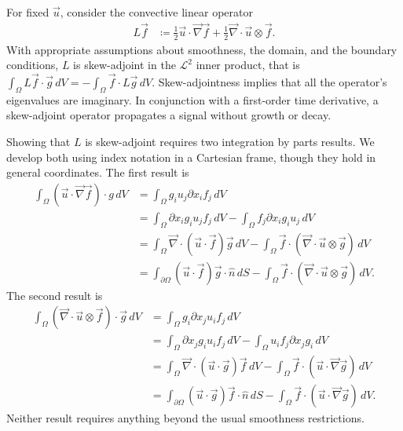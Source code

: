 \documentclass[letterpaper,reqno,11pt]{amsart}
\newcommand{\vecnabla}{\ensuremath{\vec{\nabla}}}
\begin{document}
For fixed $\vec{u}$, consider the convective linear operator
\begin{align}
  L\vec{f} &\coloneqq
      \frac{1}{2}\vec{u}\cdot\vecnabla{}\vec{f}
    + \frac{1}{2}\vecnabla\cdot\vec{u}\otimes\vec{f}.
\end{align}
With appropriate assumptions about smoothness, the domain, and the
boundary conditions, $L$ is skew-adjoint in the $\mathcal{L}^2$
inner product, that is $ \int_{\Omega} L\vec{f}\cdot\vec{g}\,d\!V =
-\int_{\Omega} \vec{f}\cdot{}L\vec{g} \,d\!V$.  Skew-adjointness implies
that all the operator's eigenvalues are imaginary.  In conjunction with a
first-order time derivative, a skew-adjoint operator propagates a signal
without growth or decay.


Showing that $L$ is skew-adjoint requires two integration by parts results.
We develop both using index notation in a Cartesian frame, though they
hold in general coordinates.  The first result is
\begin{align}
  \int_{\Omega} \left(\vec{u}\cdot\vecnabla\vec{f}\right)\cdot{g} \,d\!V
  &=
  \int_{\Omega} g_i u_j \partial\!x_{i} f_j \,d\!V
  \\
  &=
    \int_{\Omega} \partial\!x_{i} g_i u_j f_j \,d\!V
  - \int_{\Omega} f_j \partial\!x_{i} g_i u_j \,d\!V
  \\
  &=
    \int_{\Omega} \vecnabla\cdot\left(\vec{u}\cdot\vec{f}\right)\vec{g} \,d\!V
  - \int_{\Omega} \vec{f}\cdot\left(\vecnabla\cdot\vec{u}\otimes\vec{g}\right) \,d\!V
  \\
  &=
    \int_{\partial\Omega} \left(\vec{u}\cdot\vec{f}\right)\vec{g}\cdot\hat{n} \,d\!S
  - \int_{\Omega} \vec{f}\cdot\left(\vecnabla\cdot\vec{u}\otimes\vec{g}\right) \,d\!V
  .
\end{align}
The second result is
\begin{align}
  \int_{\Omega} \left(\vecnabla\cdot\vec{u}\otimes\vec{f}\right)\cdot\vec{g} \,d\!V
  &=
  \int_{\Omega} g_i \partial\!x_{j} u_i f_j \,d\!V
  \\
  &=
    \int_{\Omega} \partial\!x_{j} g_i u_i f_j \,d\!V
  - \int_{\Omega} u_i f_j \partial\!x_{j} g_i \,d\!V
  \\
  &=
    \int_{\Omega} \vecnabla\cdot\left(\vec{u}\cdot\vec{g}\right)\vec{f} \,d\!V
  - \int_{\Omega} \vec{f}\cdot\left(\vec{u}\cdot\vecnabla\vec{g}\right) \,d\!V
  \\
  &=
    \int_{\partial\Omega} \left(\vec{u}\cdot\vec{g}\right)\vec{f}\cdot\hat{n} \,d\!S
  - \int_{\Omega} \vec{f}\cdot\left(\vec{u}\cdot\vecnabla\vec{g}\right) \,d\!V
  .
\end{align}
Neither result requires anything beyond the usual smoothness restrictions.
\end{document}
